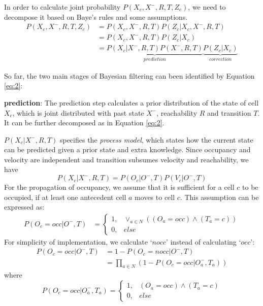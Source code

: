 In order to calculate joint probability $P(X_c, X^-, R, T, Z_c)$, we need to decompose it based on Baye's rules and some assumptions. 
\begin{align}
P(X_c, X^-, R, T, Z_c) &= P(X_c, X^-, R, T)P(Z_c|X_c, X^-, R, T) \label{eq:3}\\
                     &= P(X_c, X^-, R, T)P(Z_c|X_c) \\
                     &= \underbrace{P(X_c | X^-, R, T) P(X^-, R, T)}_{prediction} \underbrace{P(Z_c|X_c)}_{correction} \label{eq:2}
\end{align}

So far, the two main stages of Bayesian filtering can been identified by Equation \ref{eq:2}: 

\begin{my_enumerate}
\item \textbf{prediction}: The prediction step calculates a prior distribution of the state of cell $X_c$, which is joint distributed with past state $X^-$, reachability $R$ and transition $T$. It can be further decomposed as in Equation \ref{eq:2}. 

$P(X_c | X^-, R, T)$ specifies the \textit{process model}, which states how the current state can be predicted given a prior state and extra knowledge. Since occupancy and velocity are independent and transition subsumes velocity and reachability, we have
\begin{equation}
P(X_c | X^-, R, T) = P(O_c|O^-, T)P(V_c|O^-, T)
\end{equation}
For the propagation of occupancy, we assume that it is sufficient for a cell $c$ to be occupied, if at least one antecedent cell $a$ moves to cell $c$. This assumption can be expressed as:
\begin{align}
P(O_c=occ|O^-, T) &= 
  \begin{cases}
  1, & \vee_{a \in N} ((O_a=occ) \wedge (T_a=c)) \\
  0, & else
  \end{cases} 
\end{align}
For simplicity of implementation, we calculate `$nocc$' instead of calculating `$occ$':
\begin{align}
P(O_c=occ|O^-, T) &= 1 - P(O_c=nocc|O^-,T) \\
                  &= \prod_{a \in N}{(1-P(O_c=occ|O^-_a,T_a))}
\end{align}
where 
\begin{equation}
P(O_c=occ|O^-_a, T_a) =
  \begin{cases}
  1, & (O_a=occ) \wedge (T_a=c) \\
  0, & else
  \end{cases} 
\end{equation}


\end{my_enumerate}
